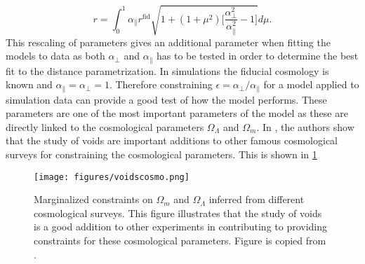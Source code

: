 \begin{equation}\label{eq:r_scaling}
    r=\int_0^1\alpha_\parallel r^{\mathrm{fid}}\sqrt{1+(1+\mu^2)\Big[\frac{\alpha_\perp^2}{\alpha_\parallel^2}-1\Big]}d\mu.
\end{equation}
This rescaling of parameters gives an additional parameter when fitting the models to data as both $\alpha_\perp$ and $\alpha_\parallel$ has to be tested in order to determine the best fit to the distance parametrization. In simulations the fiducial cosmology is known and $\alpha_\parallel=\alpha_\perp=1$. Therefore constraining $\epsilon=\alpha_\perp/\alpha_\parallel$ for a model applied to simulation data can provide a good test of how the model performs. These parameters are one of the most important parameters of the model as these are directly linked to the cosmological parameters $\Omega_\Lambda$ and $\Omega_m$. In \cite{Nadathur_2020}, the authors show that the study of voids are important additions to other famous cosmological surveys for constraining the cosmological parameters. This is shown in \ref{fig:voidscosmoparam}
\begin{figure}
    \texttt{[image: figures/voidscosmo.png]}
    \caption{Marginalized constraints on $\Omega_m$ and $\Omega_\Lambda$ inferred from different cosmological surveys. This figure illustrates that the study of voids is a good addition to other experiments in contributing to providing constraints for these cosmological parameters. Figure is copied from \cite{Nadathur_2020}.}
    \label{fig:voidscosmoparam}
\end{figure}
